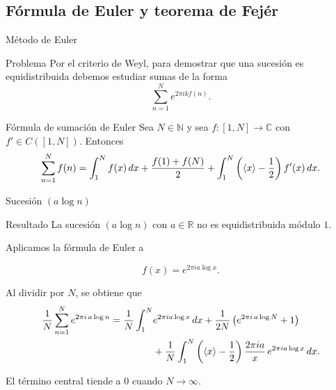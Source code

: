 \subsection{Fórmula de Euler y teorema de Fejér}

\begin{frame}{Método de Euler}

\begin{alertblock}{Problema}
Por el criterio de Weyl, para demostrar que una sucesión es
equidistribuida debemos estudiar sumas de la forma
\[\sum_{n=1}^{N} e^{2\pi i k f(n)}.\]
\end{alertblock}

\vspace{0.2cm}
\pause

\begin{block}{Fórmula de sumación de Euler}
Sea $N\in\mathbb{N}$ y sea $f:[1,N]\to\mathbb C$ con $f'\in C([1,N])$.
Entonces
\[
\sum_{n=1}^{N}f(n)=
\int_1^N f(x)\,dx + \frac{f(1)+f(N)}{2} +
\int_1^N\left(\langle x \rangle-\frac12\right)f'(x)\,dx.
\]
\end{block}
\end{frame}


\begin{frame}{Sucesión $(a\log n)$}

\begin{block}{Resultado}
La sucesión $(a\log n)$ con $a\in\mathbb{R}$ no es equidistribuida módulo $1$.
\end{block}

\vspace{0.2cm}
\pause
Aplicamos la fórmula de Euler a

\[
f(x)=e^{2\pi ia\log x}.
\]

\pause

Al dividir por \(N\), se obtiene que
\begin{align*}
\frac{1}{N}\sum_{n=1}^N e^{2\pi i \, a \log n} =
\frac{1}{N}\int_1^N &e^{2\pi i a \log x} \, dx + 
\frac{1}{2N} \left(e^{2\pi i \, a \log N} + 1\right) \\ &+
\frac{1}{N}\int_1^N \left(\langle x \rangle - \frac{1}{2}\right) \frac{2\pi i a}{x} \, e^{2\pi i a \log x} \, dx .
\end{align*}

El término central tiende a \(0\) cuando \(N \to \infty\). 
\end{frame}

